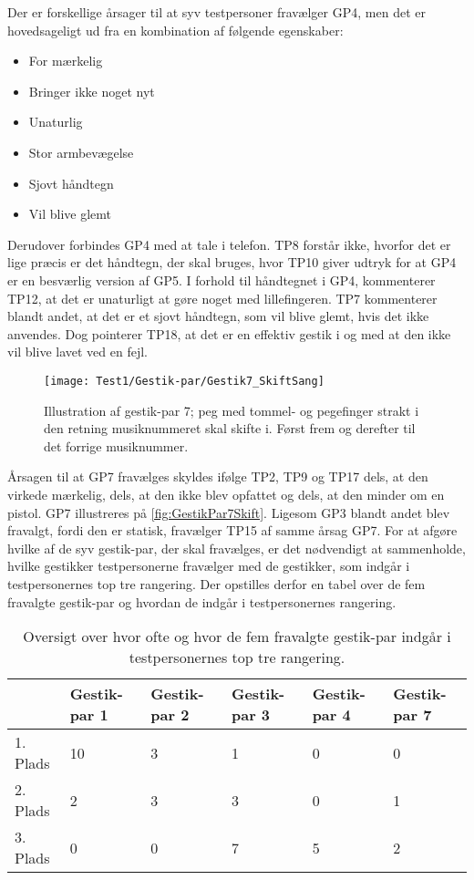 \noindent
%
Der er forskellige årsager til at syv testpersoner fravælger GP4, men det er hovedsageligt ud fra en kombination af følgende egenskaber:
%
\begin{multicols}{3}
    \begin{itemize}
        \item For mærkelig
        \item Bringer ikke noget nyt
        \item Unaturlig
        \item Stor armbevægelse
        \item Sjovt håndtegn
        \item Vil blive glemt
\end{itemize}
\end{multicols}
\noindent
%
Derudover forbindes GP4 med at tale i telefon. TP8 forstår ikke, hvorfor det er lige præcis er det håndtegn, der skal bruges, hvor TP10 giver udtryk for at GP4 er en besværlig version af GP5. I forhold til håndtegnet i GP4, kommenterer TP12, at det er unaturligt at gøre noget med lillefingeren. TP7 kommenterer blandt andet, at det er et sjovt håndtegn, som vil blive glemt, hvis det ikke anvendes. Dog pointerer TP18, at det er en effektiv gestik i og med at den ikke vil blive lavet ved en fejl.
%
\begin{figure}[H]
	\centering
	\texttt{[image: Test1/Gestik-par/Gestik7\_SkiftSang]}
	\caption{Illustration af gestik-par 7; peg med tommel- og pegefinger strakt i den retning musiknummeret skal skifte i. Først frem og derefter til det forrige musiknummer.}
	\label{fig:GestikPar7Skift}
\end{figure}
\noindent
% 
Årsagen til at GP7 fravælges skyldes ifølge TP2, TP9 og TP17 dels, at den virkede mærkelig, dels, at den ikke blev opfattet og dels, at den minder om en pistol. GP7 illustreres på \autoref{fig:GestikPar7Skift}. Ligesom GP3 blandt andet blev fravalgt, fordi den er statisk, fravælger TP15 af samme årsag GP7.\blankline
%
For at afgøre hvilke af de syv gestik-par, der skal fravælges, er det nødvendigt at sammenholde, hvilke gestikker testpersonerne fravælger med de gestikker, som indgår i testpersonernes top tre rangering. Der opstilles derfor en tabel over de fem fravalgte gestik-par og hvordan de indgår i testpersonernes rangering.    
%
\begin{table}[H]
	\centering
	\begin{tabular}{ | p{1.5cm} | p{2.1cm} | p{2.1cm} | p{2.1cm} | p{2.1cm} | p{2.1cm} |}
	\hline
		 & Gestik-par 1 & Gestik-par 2 & Gestik-par 3 & Gestik-par 4 & Gestik-par 7 \\ \hline
		1. Plads & 10 & 3 & 1 & 0 & 0\\ \hline
		2. Plads & 2 & 3 & 3 & 0 & 1\\ \hline
		3. Plads & 0 & 0 & 7 & 5 & 2\\ \hline
	\end{tabular}
	\caption{Oversigt over hvor ofte og hvor de fem fravalgte gestik-par indgår i testpersonernes top tre rangering.}
	\label{tab:FravalgteTopTreSkift}
\end{table}
